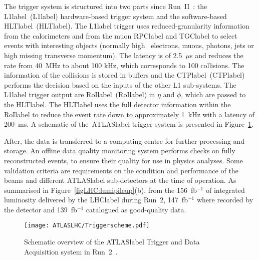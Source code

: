 The trigger system is structured into two parts since Run~II~\cite{Jenni:616089,Ruiz-Martinez:2133909}: the \acrlong{L1label}~(\acrshort{L1label}) hardware-based trigger system and the software-based \acrlong{HLTlabel}~(\acrshort{HLTlabel}). The \acrshort{L1label} trigger uses reduced-granularity information from the calorimeters and from the muon \acrshort{RPClabel} and \acrshort{TGClabel} to select events with interesting objects (normally high \pT\ electrons, muons, photons, jets or high missing transverse momentum). The latency is of 2.5~$\mu$s and reduces the rate from 40~MHz to about 100 kHz, which corresponds to 100 collisions. The information of the collisions is stored in buffers and the \acrlong{CTPlabel}~(\acrshort{CTPlabel}) performs the decision based on the inputs of the other L1 sub-systems. The \acrshort{L1label} trigger output are \acrlong{RoIlabel}~(\acrshort{RoIlabel}) in $\eta$ and $\phi$, which are passed to the \acrshort{HLTlabel}. The \acrshort{HLTlabel} uses the full detector information within the \acrshort{RoIlabel} to reduce the event rate down to approximately 1~kHz with a latency of 200~ms. A schematic of the~\acrshort{ATLASlabel} trigger system is presented in Figure~\ref{figLHC:ATLASTDAQ}.

After, the data is transferred to a computing centre for further processing and storage. An offline data quality monitoring system performs checks on fully reconstructed events, to ensure their quality for use in physics analyses. Some validation criteria are requirements on the condition and performance of the beams and different \acrshort{ATLASlabel} sub-detectors at the time of operation. As summarised in Figure~\ref{figLHC:lumipileup}(b), from the 156~fb$^{-1}$ of integrated luminosity delivered by the \acrshort{LHClabel} during Run~2, 147~fb$^{-1}$ where recorded by the detector and 139~fb$^{-1}$ catalogued as good-quality data.

\begin{figure}[htbp]
    \RawFloats
    \begin{center}
    \texttt{[image: ATLASLHC/Triggerscheme.pdf]}
    \caption{
        Schematic overview of the \acrshort{ATLASlabel} Trigger and Data Acquisition system in Run~2~\cite{publicTDAQ}. 
    }
    \label{figLHC:ATLASTDAQ}
    \end{center}
\end{figure}